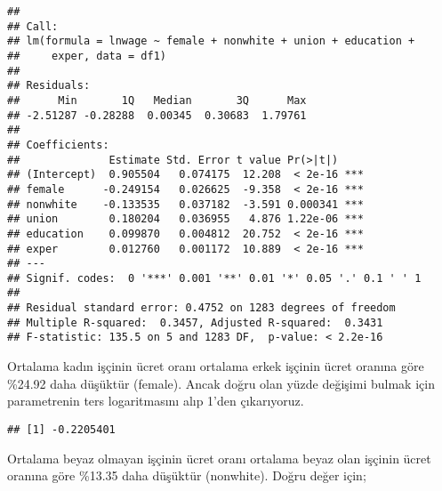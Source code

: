 \documentclass[
]{book}
\newenvironment{Shaded}{\begin{snugshade}}{\end{snugshade}}
\newcommand{\CommentTok}[1]{\textcolor[rgb]{0.56,0.35,0.01}{\textit{#1}}}
\newcommand{\DecValTok}[1]{\textcolor[rgb]{0.00,0.00,0.81}{#1}}
\newcommand{\KeywordTok}[1]{\textcolor[rgb]{0.13,0.29,0.53}{\textbf{#1}}}
\newcommand{\NormalTok}[1]{#1}
\newcommand{\OperatorTok}[1]{\textcolor[rgb]{0.81,0.36,0.00}{\textbf{#1}}}
\newcommand{\StringTok}[1]{\textcolor[rgb]{0.31,0.60,0.02}{#1}}
\begin{document}
\begin{verbatim}
## 
## Call:
## lm(formula = lnwage ~ female + nonwhite + union + education + 
##     exper, data = df1)
## 
## Residuals:
##      Min       1Q   Median       3Q      Max 
## -2.51287 -0.28288  0.00345  0.30683  1.79761 
## 
## Coefficients:
##              Estimate Std. Error t value Pr(>|t|)    
## (Intercept)  0.905504   0.074175  12.208  < 2e-16 ***
## female      -0.249154   0.026625  -9.358  < 2e-16 ***
## nonwhite    -0.133535   0.037182  -3.591 0.000341 ***
## union        0.180204   0.036955   4.876 1.22e-06 ***
## education    0.099870   0.004812  20.752  < 2e-16 ***
## exper        0.012760   0.001172  10.889  < 2e-16 ***
## ---
## Signif. codes:  0 '***' 0.001 '**' 0.01 '*' 0.05 '.' 0.1 ' ' 1
## 
## Residual standard error: 0.4752 on 1283 degrees of freedom
## Multiple R-squared:  0.3457, Adjusted R-squared:  0.3431 
## F-statistic: 135.5 on 5 and 1283 DF,  p-value: < 2.2e-16
\end{verbatim}

Ortalama kadın işçinin ücret oranı ortalama erkek işçinin ücret oranına göre \%24.92 daha düşüktür (female). Ancak doğru olan yüzde değişimi bulmak için parametrenin ters logaritmasını alıp 1'den çıkarıyoruz.

\begin{Shaded}
\end{Shaded}

\begin{verbatim}
## [1] -0.2205401
\end{verbatim}

Ortalama beyaz olmayan işçinin ücret oranı ortalama beyaz olan işçinin ücret oranına göre \%13.35 daha düşüktür (nonwhite). Doğru değer için;

\begin{Shaded}
\end{Shaded}
\end{document}
